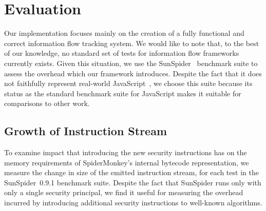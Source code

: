 
\section{Evaluation}
\label{sec:evaluation}

%

Our implementation focuses mainly on the creation of a fully functional and correct information flow tracking system.
We would like to note that, to the best of our knowledge, no standard set of tests for information flow frameworks currently exists.
Given this situation, we use the SunSpider~\cite{sunspider} benchmark suite to assess the overhead which our framework introduces.
Despite the fact that it does not faithfully represent real-world JavaScript~\cite{jsmeter}, we choose this suite because its status as the standard benchmark suite for JavaScript makes it suitable for comparisons to other work.

\subsection{Growth of Instruction Stream}


To examine impact that introducing the new security instructions has on the memory requirements of SpiderMonkey's internal bytecode representation, we measure the change in size of the emitted instruction stream, for each test in the SunSpider~0.9.1 benchmark suite.
Despite the fact that SunSpider runs only with only a single security principal, we find it useful for measuring the overhead incurred by introducing additional security instructions to well-known algorithms.

